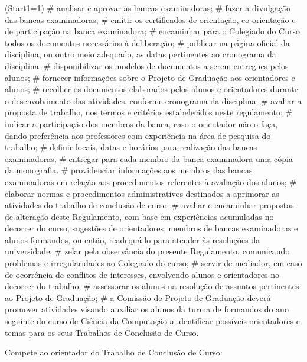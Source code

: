 \documentclass[12pt,geral,titlewithdate]{uftdocs}
\begin{document}
\begin{easylist}\ListProperties(Start1=1)
# analisar e aprovar as bancas examinadoras;
# fazer a divulgação das bancas examinadoras;
# emitir os certificados de orientação, co-orientação e de participação na banca examinadora;
# encaminhar para o Colegiado do Curso todos os documentos necessários à deliberação;
# publicar na página oficial da disciplina, ou outro meio adequado, as datas pertinentes ao cronograma da disciplina.
# disponibilizar os modelos de documentos a serem entregues pelos alunos;
# fornecer informações sobre o Projeto de Graduação aos orientadores e alunos;
# recolher os documentos elaborados pelos alunos e orientadores durante o desenvolvimento das atividades, conforme cronograma da disciplina;
# avaliar a proposta de trabalho, nos termos e critérios estabelecidos neste regulamento;
# indicar a participação dos membros da banca, caso o orientador não o faça, dando preferência aos professores com experiência na área de pesquisa do trabalho;
# definir locais, datas e horários para realização das bancas examinadoras;
# entregar para cada membro da banca examinadora uma cópia da monografia.
# providenciar informações aos membros das bancas examinadoras em relação aos procedimentos referentes à avaliação dos alunos;
# elaborar normas e procedimentos administrativos destinados a aprimorar as atividades do trabalho de conclusão de curso;
# avaliar e encaminhar propostas de alteração deste Regulamento, com base em experiências acumuladas no decorrer do curso, sugestões de orientadores, membros de bancas examinadoras e alunos formandos, ou então, readequá-lo para atender às resoluções da universidade;
# zelar pela observância do presente Regulamento, comunicando problemas e irregularidades ao Colegiado do curso;
# servir de mediador, em caso de ocorrência de conflitos de interesses, envolvendo alunos e orientadores no decorrer do trabalho;
# assessorar os alunos na resolução de assuntos pertinentes ao Projeto de Graduação;
# a Comissão de Projeto de Graduação deverá promover atividades visando auxiliar os alunos da turma de formandos do ano seguinte do curso de Ciência da Computação a identificar possíveis orientadores e temas para os seus Trabalhos de Conclusão de Curso.
\end{easylist}

\artigo Compete ao orientador do Trabalho de Conclusão de Curso:
\end{document}
